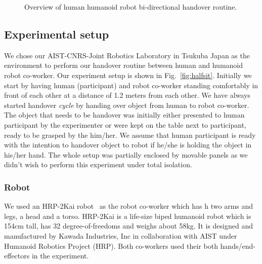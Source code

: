 \documentclass[a4paper, 12pt, oneside]{Thesis}  %
\begin{document}
\begin{figure}[htp]
	
	\caption{Overview of human humanoid robot bi-directional handover routine.}
	\label{fig:handover routine}
\end{figure}


\subsection{Experimental setup}
We chose our AIST-CNRS-Joint Robotics Laboratory in Tsukuba Japan as the environment to perform our handover routine between human and humanoid robot co-worker. Our experiment setup is shown in Fig.~\ref{fig:halfsit}. Initially we start by having human (participant) and robot co-worker standing comfortably in front of each other at a distance of 1.2 meters from each other. We have always started handover \textit{cycle} by handing over object from human to robot co-worker. The object that needs to be handover was initially either presented to human participant by the experimenter or were kept on the table next to participant, ready to be grasped by the him/her. We assume that human participant is ready with the intention to handover object to robot if he/she is holding the object in his/her hand. The whole setup was partially enclosed by movable panels as we didn't wish to perform this experiment under total isolation.


\subsubsection{Robot}
We used an HRP-2Kai robot~\cite{Kaneko:RAS_ICHR:2015} as the robot co-worker which has  h two arms and legs, a head and a torso. HRP-2Kai is a life-size biped humanoid robot which is 154cm tall, has 32 degree-of-freedoms and weighs about 58kg. It is designed and manufactured by Kawada Industries, Inc in collaboration with AIST under Humanoid Robotics Project (HRP). Both co-workers used their both hands/end-effectors in the experiment.
\end{document}
